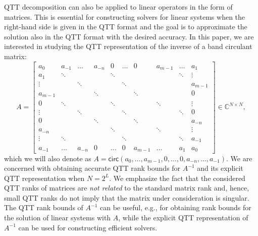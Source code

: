 \documentclass[a4paper]{article}
\newcommand{\LL}{L}
\begin{document}
QTT decomposition can also be applied to linear operators in the form of matrices.
This is essential for constructing solvers for linear systems when the right-hand side is given in the QTT format and the goal is to approximate the solution also in the QTT format with the desired accuracy. 
In this paper, we are interested in studying the QTT representation of the inverse of a band circulant matrix: 
\begin{equation}\label{eq:A}
	A=
	\begin{bmatrix}
a_0     & a_{-1} & \dots  & a_{-n} & 0      & \dots  & 0       & a_{m-1} & \dots  & a_1     \\
a_1     & \ddots &        &        & \ddots &        &         &         & \ddots & \vdots  \\
\vdots  &        & \ddots &        &        & \ddots &         &         &        & a_{m-1} \\
a_{m-1} &        &        & \ddots &        &        & \ddots  &         &        & 0       \\
0       & \ddots &        &        & \ddots &        &         & \ddots  &        & \vdots  \\
\vdots  &        & \ddots &        &        & \ddots &         &         & \ddots & 0       \\
0       &        &        & \ddots &        &        & \ddots  &         &        & a_{-n}  \\
a_{-n}  &        &        &        & \ddots &        &         & \ddots  &        & \vdots  \\
\vdots  & \ddots &        &        &        & \ddots &         &         & \ddots & a_{-1}  \\
a_{-1}  & \dots  & a_{-n} & 0      & \dots  & 0      & a_{m-1} & \dots   & a_1    & a_0    
	\end{bmatrix}\in\mathbb{C}^{N\times N},
	\end{equation}
	which we will also denote as $A = \mathsf{circ}(a_0,\dots, a_{m-1}, 0,\dots, 0, a_{-n},\dots, a_{-1})$.
We are concerned with obtaining accurate QTT rank bounds for $A^{-1}$ and its explicit QTT representation when $N = 2^\LL$.
We emphasize the fact that the considered QTT ranks of matrices are \emph{not related} to the standard matrix rank and, hence, small QTT ranks do not imply that the matrix under consideration is singular.
The QTT rank bounds of $A^{-1}$ can be useful, e.g., for obtaining rank bounds for the solution of linear systems with $A$, while the explicit QTT representation of $A^{-1}$ can be used for constructing efficient solvers.
\end{document}
